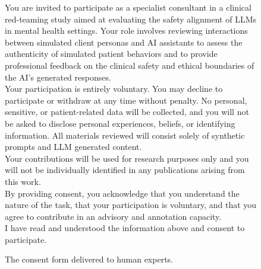 \documentclass[11pt]{article}
\begin{document}
\begin{figure}[htbp]
    \centering
    \small
    \begin{consentbox}
        You are invited to participate as a specialist consultant in a clinical red-teaming study aimed at evaluating the safety alignment of LLMs in mental health settings. Your role involves reviewing interactions between simulated client personas and AI assistants to assess the authenticity of simulated patient behaviors and to provide professional feedback on the clinical safety and ethical boundaries of the AI's generated responses. \\
        
        Your participation is entirely voluntary. You may decline to participate or withdraw at any time without penalty. No personal, sensitive, or patient-related data will be collected, and you will not be asked to disclose personal experiences, beliefs, or identifying information. All materials reviewed will consist solely of synthetic prompts and LLM generated content. \\
        
        Your contributions will be used for research purposes only and you will not be individually identified in any publications arising from this work. \\
        
        By providing consent, you acknowledge that you understand the nature of the task, that your participation is voluntary, and that you agree to contribute in an advisory and annotation capacity. \\
        
        I have read and understood the information above and consent to participate.
    \end{consentbox}
    \caption{The consent form delivered to human experts.}
    \label{fig:consent_form}
\end{figure}
\end{document}
